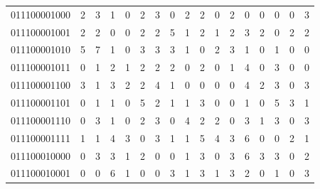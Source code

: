 \documentclass[10pt,a4paper]{article}
\begin{document}
\begin{longtable}{ |c|c|c|c|c|c|c|c|c|c|c|c|c|c|c|c|c| }
    011100001000              & 2                            & 3                                & 1                            & 0                              & 2   & 3   & 0   & 2   & 2   & 0   & 2   & 0   & 0   & 0   & 0   & 3   \\
    011100001001              & 2                            & 2                                & 0                            & 0                              & 2   & 2   & 5   & 1   & 2   & 1   & 2   & 3   & 2   & 0   & 2   & 2   \\
    011100001010              & 5                            & 7                                & 1                            & 0                              & 3   & 3   & 3   & 1   & 0   & 2   & 3   & 1   & 0   & 1   & 0   & 0   \\
    011100001011              & 0                            & 1                                & 2                            & 1                              & 2   & 2   & 2   & 0   & 2   & 0   & 1   & 4   & 0   & 3   & 0   & 0   \\
    011100001100              & 3                            & 1                                & 3                            & 2                              & 2   & 4   & 1   & 0   & 0   & 0   & 0   & 4   & 2   & 3   & 0   & 3   \\
    011100001101              & 0                            & 1                                & 1                            & 0                              & 5   & 2   & 1   & 1   & 3   & 0   & 0   & 1   & 0   & 5   & 3   & 1   \\
    011100001110              & 0                            & 3                                & 1                            & 0                              & 2   & 3   & 0   & 4   & 2   & 2   & 0   & 3   & 1   & 3   & 0   & 3   \\
    011100001111              & 1                            & 1                                & 4                            & 3                              & 0   & 3   & 1   & 1   & 5   & 4   & 3   & 6   & 0   & 0   & 2   & 1   \\
    011100010000              & 0                            & 3                                & 3                            & 1                              & 2   & 0   & 0   & 1   & 3   & 0   & 3   & 6   & 3   & 3   & 0   & 2   \\
    011100010001              & 0                            & 0                                & 6                            & 1                              & 0   & 0   & 3   & 1   & 3   & 1   & 3   & 2   & 0   & 1   & 0   & 3   \\

\end{longtable}
\end{document}
